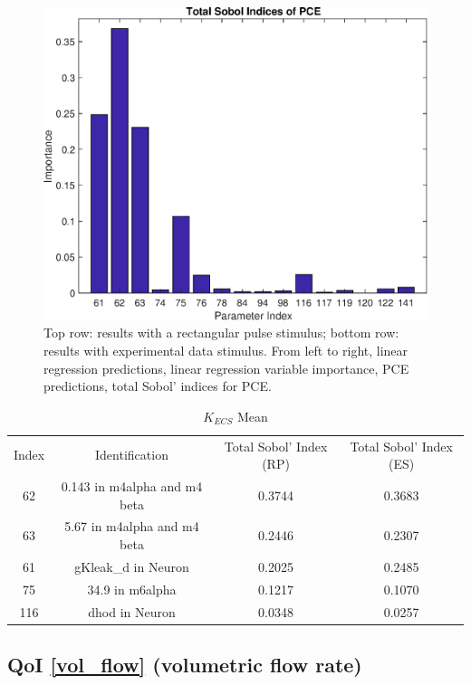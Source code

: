 \documentclass[12pt]{article}
\numberwithin{equation}{section}
\begin{document}
\begin{figure}[h]
\includegraphics[width=.24 \textwidth]{Figures/K_ECS_Mean_QoI_PCE_SI_Experimental.eps}
\caption{Top row: results with a rectangular pulse stimulus; bottom row: results with experimental data stimulus. From left to right, linear regression predictions, linear regression variable importance, PCE predictions, total Sobol' indices for PCE.}
\vspace{-.5 cm}
\end{figure}

\begin{table}[h]
\centering
\begin{tabular}{cccc}
Index & Identification & Total Sobol' Index (RP) & Total Sobol' Index (ES)\\
62 & 0.143 in m4alpha and m4 beta &  0.3744 & 0.3683\\
63 & 5.67 in m4alpha and m4 beta & 0.2446 & 0.2307\\
61 & gKleak\_d in Neuron & 0.2025 & 0.2485\\
75 & 34.9 in m6alpha & 0.1217 & 0.1070\\
116 & dhod in Neuron &  0.0348 & 0.0257\\
\end{tabular}
\caption{$K_{ECS}$ Mean}
\vspace{-1.5 cm}
\label{K_ECS_Mean}
\end{table}

\newpage

\subsection{QoI \eqref{vol_flow} (volumetric flow rate)}
\end{document}
